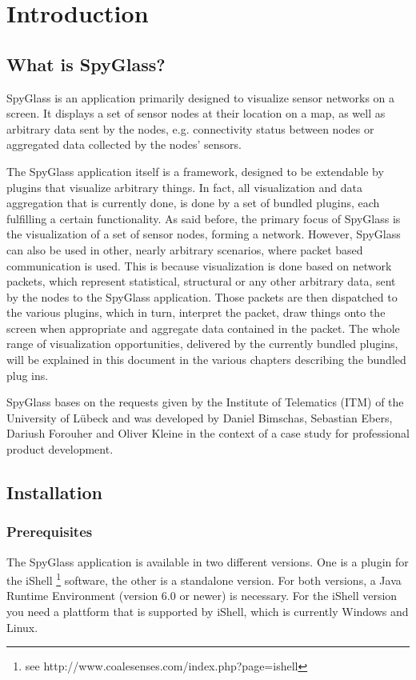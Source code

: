 \section{Introduction}
\label{section:s_introduction}

	\subsection{What is SpyGlass?}
		SpyGlass is an application primarily designed to visualize sensor networks on 
		a screen. It displays a set of sensor nodes at their location on a map, as well 
		as arbitrary data sent by the nodes, e.g. connectivity status between nodes or 
		aggregated data collected by the nodes’ sensors.
	
		The SpyGlass application itself is a framework, designed to be extendable by 
		plugins that visualize arbitrary things. In fact, all visualization and data aggregation
		that is currently done, is done by a set of bundled plugins, each fulfilling a 
		certain functionality. As said before, the primary focus of SpyGlass is the
		visualization of a set of sensor nodes, forming a network. However, SpyGlass can
		also be used in other, nearly arbitrary scenarios, where packet based communication 
		is used. This is because visualization is done based on network packets, 
		which represent statistical, structural or any other arbitrary data, sent by the 
		nodes to the SpyGlass application. Those packets are then dispatched to the 
		various plugins, which in turn, interpret the packet, draw things onto the screen 
		when appropriate and aggregate data contained in the packet. The whole range of visualization 
		opportunities, delivered by the currently bundled plugins, will be explained in 
		this document in the various chapters describing the bundled plug ins.
		
		SpyGlass bases on the requests given by the Institute of Telematics (ITM) of 
		the University of Lübeck and was developed by Daniel Bimschas, Sebastian 
		Ebers, Dariush Forouher and Oliver Kleine in the context of a case study for 
		professional product development.

	\subsection{Installation}
	
		\subsubsection{Prerequisites}
			The SpyGlass application is available in two different versions. One is a plugin 
			for the iShell \footnote{see http://www.coalesenses.com/index.php?page=ishell}
			software, the other is a standalone version. For both versions, a 
			Java Runtime Environment (version 6.0 or newer) is necessary. For the iShell 
			version you need a plattform that is supported by iShell, which is currently 
			Windows and Linux.

